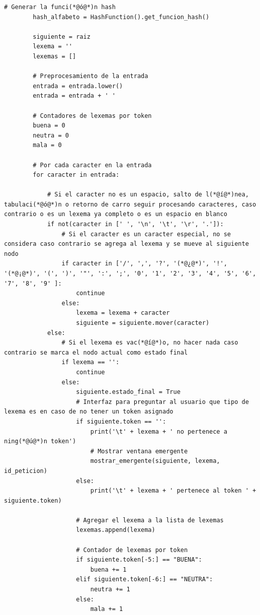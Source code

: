 \documentclass[10pt,times,twocolumn]{article}
\begin{document}
\begin{lstlisting}[caption={Core del análisis. Procesar}, xleftmargin=0.05\textwidth]
        # Generar la funci(*@ó@*)n hash
        hash_alfabeto = HashFunction().get_funcion_hash()

        siguiente = raiz
        lexema = ''
        lexemas = []

        # Preprocesamiento de la entrada
        entrada = entrada.lower()
        entrada = entrada + ' '

        # Contadores de lexemas por token
        buena = 0
        neutra = 0
        mala = 0

        # Por cada caracter en la entrada
        for caracter in entrada:
            
            # Si el caracter no es un espacio, salto de l(*@í@*)nea, tabulaci(*@ó@*)n o retorno de carro seguir procesando caracteres, caso contrario o es un lexema ya completo o es un espacio en blanco 
            if not(caracter in [' ', '\n', '\t', '\r', '.']):
                # Si el caracter es un caracter especial, no se considera caso contrario se agrega al lexema y se mueve al siguiente nodo
                if caracter in ['/', ',', '?', '(*@¿@*)', '!', '(*@¡@*)', '(', ')', '"', ':', ';', '0', '1', '2', '3', '4', '5', '6', '7', '8', '9' ]:
                    continue
                else:
                    lexema = lexema + caracter
                    siguiente = siguiente.mover(caracter)
            else:
                # Si el lexema es vac(*@í@*)o, no hacer nada caso contrario se marca el nodo actual como estado final
                if lexema == '':
                    continue
                else:
                    siguiente.estado_final = True
                    # Interfaz para preguntar al usuario que tipo de lexema es en caso de no tener un token asignado
                    if siguiente.token == '':
                        print('\t' + lexema + ' no pertenece a ning(*@ú@*)n token')
                        # Mostrar ventana emergente
                        mostrar_emergente(siguiente, lexema, id_peticion)
                    else:
                        print('\t' + lexema + ' pertenece al token ' + siguiente.token)

                    # Agregar el lexema a la lista de lexemas
                    lexemas.append(lexema)
                    
                    # Contador de lexemas por token
                    if siguiente.token[-5:] == "BUENA":
                        buena += 1
                    elif siguiente.token[-6:] == "NEUTRA":
                        neutra += 1
                    else:
                        mala += 1
                    

\end{lstlisting}
\end{document}
